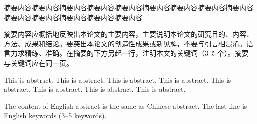 
\begin{cnabstract}
  摘要内容摘要内容摘要内容摘要内容摘要内容摘要内容摘要内容摘要内容摘要内容摘要内容摘要内容摘要内容摘要内容摘要内容

  摘要内容应概括地反映出本论文的主要内容，主要说明本论文的研究目的、内容、方法、成果和结论。要突出本论文的创造性成果或新见解，不要与引言相混淆。语言力求精练、准确。在摘要的下方另起一行，注明本文的关键词（3--5 个）。摘要与关键词应在同一页。
\end{cnabstract}


\begin{enabstract}
  This is abstract. This is abstract. This is abstract. This is abstract. This is abstract. This is abstract. This is abstract. This is abstract.

  The content of English abstract is the same as Chinese abstract. The last line is English keywords (3--5 keywords).
\end{enabstract}
